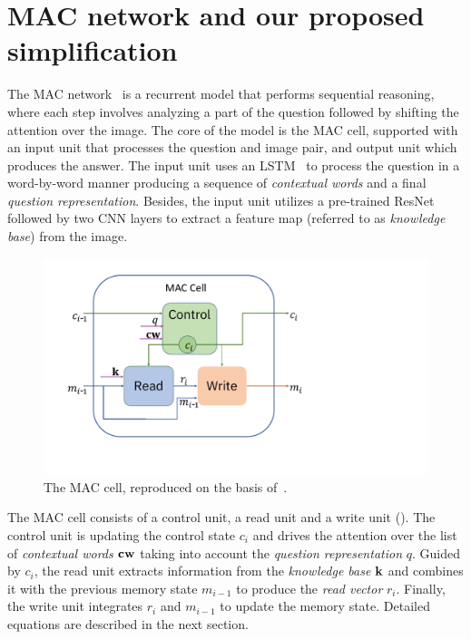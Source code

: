 \section{MAC network and our proposed simplification}
\label{sec:models}


The MAC network~\cite{hudson2018compositional} is a recurrent model that performs sequential reasoning, where each step involves analyzing a part of the question followed by shifting the attention over the image.
The core of the model is the MAC cell, supported with an input unit that processes the question and image pair, and output unit which produces the answer.
The input unit  uses an LSTM~\cite{hochreiter1997long} to process the question in a word-by-word manner producing a sequence of \emph{contextual words} and a final \emph{question representation}.
Besides, the input unit utilizes a pre-trained ResNet~\cite{he2016resnet} followed by two CNN layers to extract a feature map (referred to as \emph{knowledge base}) from the image.

\begin{figure}
	\vspace{-15pt}
	\centering
	\includegraphics[width=\textwidth]{../img/mac_cell.pdf}
	\caption{The MAC cell, reproduced on the basis of~\cite{hudson2018compositional}.}
	\label{fig:mac_cell}
	\vspace{-5pt}
\end{figure}

	
The MAC cell consists of a control unit, a read unit and a write unit ().
The control unit is updating the control state $c_i$ and drives the attention over the list of \emph{contextual words} $\mathbf{cw}$ taking into account the \emph{question representation} $q$.
Guided by $c_i$,  the read unit extracts information from the \emph{knowledge base} $\mathbf{k}$ and combines it with the previous memory state $m_{i-1}$  to produce the \emph{read vector} $r_i$.
Finally, the write unit integrates $r_i$ and $m_{i-1}$ to update the memory state. Detailed equations are described in the next section.
